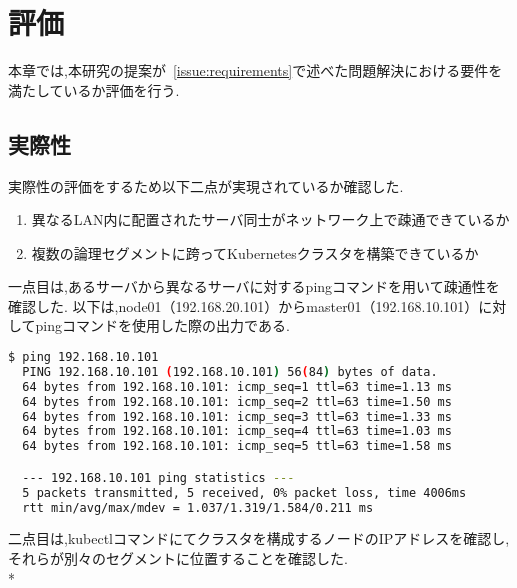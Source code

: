 \chapter{評価}
\label{evaluation}

本章では,本研究の提案が~\ref{issue:requirements}で述べた問題解決における要件を満たしているか評価を行う.

\section{実際性}
\label{evaluation:method}

実際性の評価をするため以下二点が実現されているか確認した.

\begin{enumerate}
  \item 異なるLAN内に配置されたサーバ同士がネットワーク上で疎通できているか
  \item 複数の論理セグメントに跨ってKubernetesクラスタを構築できているか
\end{enumerate}

一点目は,あるサーバから異なるサーバに対するpingコマンドを用いて疎通性を確認した.
以下は,node01（192.168.20.101）からmaster01（192.168.10.101）に対してpingコマンドを使用した際の出力である.

\begin{lstlisting}[language=bash]
  $ ping 192.168.10.101
  PING 192.168.10.101 (192.168.10.101) 56(84) bytes of data.
  64 bytes from 192.168.10.101: icmp_seq=1 ttl=63 time=1.13 ms
  64 bytes from 192.168.10.101: icmp_seq=2 ttl=63 time=1.50 ms
  64 bytes from 192.168.10.101: icmp_seq=3 ttl=63 time=1.33 ms
  64 bytes from 192.168.10.101: icmp_seq=4 ttl=63 time=1.03 ms
  64 bytes from 192.168.10.101: icmp_seq=5 ttl=63 time=1.58 ms

  --- 192.168.10.101 ping statistics ---
  5 packets transmitted, 5 received, 0% packet loss, time 4006ms
  rtt min/avg/max/mdev = 1.037/1.319/1.584/0.211 ms
\end{lstlisting}

二点目は,kubectlコマンドにてクラスタを構成するノードのIPアドレスを確認し,それらが別々のセグメントに位置することを確認した.\\*

